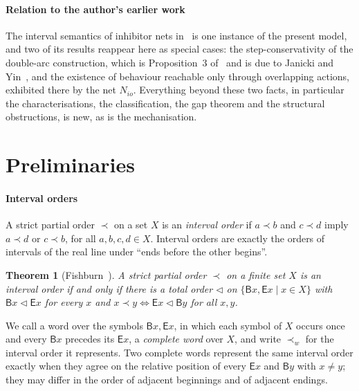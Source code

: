 \documentclass[preprint,12pt]{elsarticle}
\theoremstyle{plain}
\newtheorem{theorem}{Theorem}[section]
\theoremstyle{definition}
\newcommand{\B}[1]{\mathsf{B}#1}
\newcommand{\E}[1]{\mathsf{E}#1}
\begin{document}
\paragraph{Relation to the author's earlier work}
The interval semantics of inhibitor nets in~\cite{AlqarniJanicki2015,Alqarni2016,AlqarniJanicki2018} is one instance of the present model, and two of its results reappear here as special cases: the step-conservativity of the double-arc construction, which is Proposition~3 of~\cite{AlqarniJanicki2018} and is due to Janicki and Yin~\cite{JanickiYin2017}, and the existence of behaviour reachable only through overlapping actions, exhibited there by the net $N_{io}$. Everything beyond these two facts, in particular the characterisations, the classification, the gap theorem and the structural obstructions, is new, as is the mechanisation.

\section{Preliminaries}
\label{sec:prelim}

\paragraph{Interval orders}
A strict partial order $\prec$ on a set $X$ is an \emph{interval order} if $a \prec b$ and $c \prec d$ imply $a \prec d$ or $c \prec b$, for all $a, b, c, d \in X$. Interval orders are exactly the orders of intervals of the real line under ``ends before the other begins''.

\begin{theorem}[Fishburn~\cite{Fishburn1970}]
\label{thm:fishburn}
A strict partial order $\prec$ on a finite set $X$ is an interval order if and only if there is a total order $\lhd$ on $\{\B{x}, \E{x} \mid x \in X\}$ with $\B{x} \lhd \E{x}$ for every $x$ and $x \prec y \iff \E{x} \lhd \B{y}$ for all $x, y$.
\end{theorem}

We call a word over the symbols $\B{x}, \E{x}$, in which each symbol of $X$ occurs once and every $\B{x}$ precedes its $\E{x}$, a \emph{complete word} over $X$, and write $\prec_w$ for the interval order it represents. Two complete words represent the same interval order exactly when they agree on the relative position of every $\E{x}$ and $\B{y}$ with $x \neq y$; they may differ in the order of adjacent beginnings and of adjacent endings.
\end{document}
